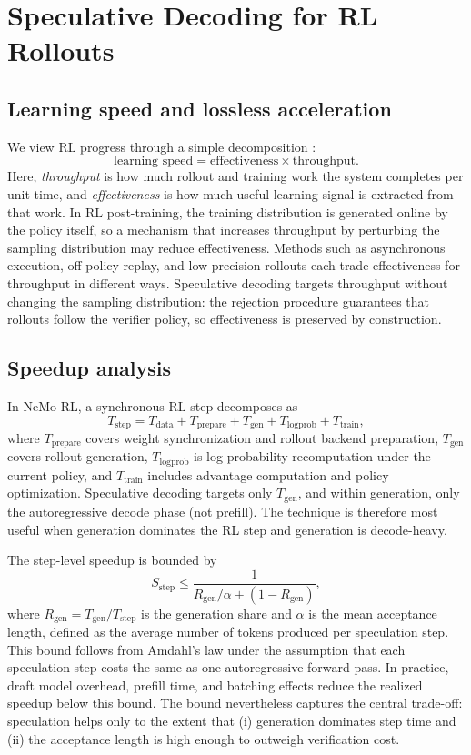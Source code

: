 \documentclass[11pt, logo, onecolumn, copyright, colorlinks=true, allcolors=blue]{nvidiatechreport}
\begin{document}
\section{Speculative Decoding for RL Rollouts}
\label{sec:method}

\subsection{Learning speed and lossless acceleration}
\label{sub:learning_speed}

We view RL progress through a simple decomposition \citep{piche2025pipelinerl}:
\[
\text{learning speed} = \text{effectiveness} \times \text{throughput}.
\]
Here, \emph{throughput} is how much rollout and training work the system completes per unit time, and \emph{effectiveness} is how much useful learning signal is extracted from that work. In RL post-training, the training distribution is generated online by the policy itself, so a mechanism that increases throughput by perturbing the sampling distribution may reduce effectiveness. Methods such as asynchronous execution, off-policy replay, and low-precision rollouts each trade effectiveness for throughput in different ways. Speculative decoding targets throughput without changing the sampling distribution: the rejection procedure guarantees that rollouts follow the verifier policy, so effectiveness is preserved by construction.

\subsection{Speedup analysis}
\label{sub:speedup_analysis}

In NeMo RL, a synchronous RL step decomposes as
\[
T_{\text{step}} = T_{\text{data}} + T_{\text{prepare}} + T_{\text{gen}} + T_{\text{logprob}} + T_{\text{train}},
\]
where $T_{\text{prepare}}$ covers weight synchronization and rollout backend preparation, $T_{\text{gen}}$ covers rollout generation, $T_{\text{logprob}}$ is log-probability recomputation under the current policy, and $T_{\text{train}}$ includes advantage computation and policy optimization. Speculative decoding targets only $T_{\text{gen}}$, and within generation, only the autoregressive decode phase (not prefill). The technique is therefore most useful when generation dominates the RL step and generation is decode-heavy.

The step-level speedup is bounded by
\[
S_{\text{step}} \le \frac{1}{R_{\text{gen}} / \alpha + (1 - R_{\text{gen}})},
\]
where $R_{\text{gen}} = T_{\text{gen}} / T_{\text{step}}$ is the generation share and $\alpha$ is the mean acceptance length, defined as the average number of tokens produced per speculation step. This bound follows from Amdahl's law under the assumption that each speculation step costs the same as one autoregressive forward pass. In practice, draft model overhead, prefill time, and batching effects reduce the realized speedup below this bound. The bound nevertheless captures the central trade-off: speculation helps only to the extent that (i) generation dominates step time and (ii) the acceptance length is high enough to outweigh verification cost.
\end{document}
